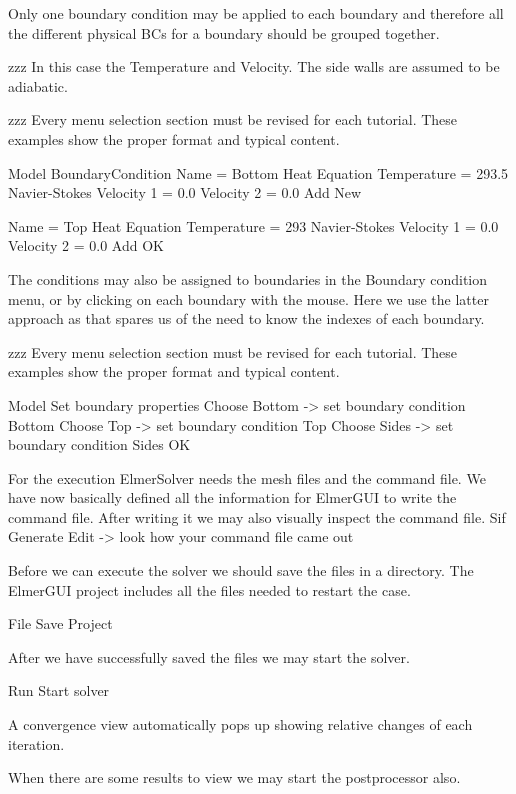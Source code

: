 Only one boundary condition may be applied to each boundary and therefore all the different physical BCs for a boundary should be grouped together. 

zzz In this case the Temperature and Velocity. The side walls are assumed to be adiabatic.

zzz Every menu selection section must be revised for each tutorial.  These examples show the proper format and typical content.

\ttbegin
Model
  BoundaryCondition
    Name = Bottom
    Heat Equation
      Temperature = 293.5
    Navier-Stokes 
      Velocity 1 = 0.0
      Velocity 2 = 0.0
    Add
    New

    Name = Top
    Heat Equation
      Temperature = 293
    Navier-Stokes 
      Velocity 1 = 0.0
      Velocity 2 = 0.0
    Add
   OK 
\ttend   

The conditions may also be assigned to boundaries in the Boundary condition menu, or by clicking on each boundary with the mouse. Here we use the latter approach as that spares us of the need to know the indexes of each boundary.

zzz Every menu selection section must be revised for each tutorial.  These examples show the proper format and typical content.

\ttbegin
Model
  Set boundary properties
    Choose Bottom -> set boundary condition Bottom
    Choose Top -> set boundary condition Top
    Choose Sides -> set boundary condition Sides
   OK 
\ttend

For the execution ElmerSolver needs the mesh files and the command file.  We have now basically defined all the information for ElmerGUI to write the command file. After writing it we may also visually inspect the command file.
\ttbegin
Sif 
  Generate
  Edit -> look how your command file came out  
\ttend

Before we can execute the solver we should save the files in a directory.  The ElmerGUI project includes all the files needed to restart the case.

\ttbegin
File 
  Save Project
\ttend

After we have successfully saved the files we may start the solver.

\ttbegin
Run
  Start solver
\ttend

A convergence view automatically pops up showing relative changes of each iteration.

When there are some results to view we may start the postprocessor also.

